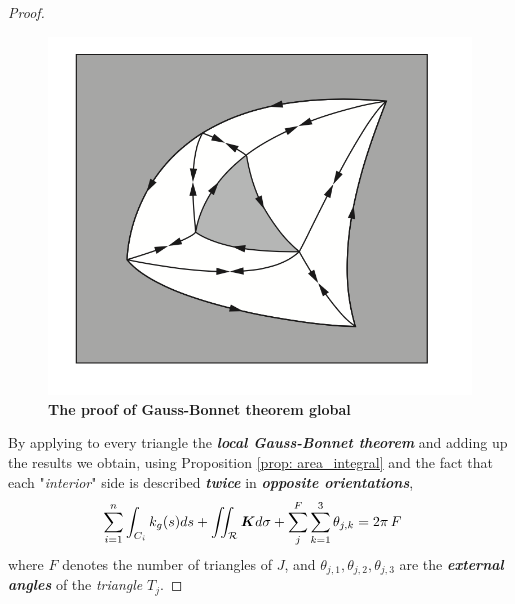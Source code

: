 \documentclass[11pt]{article}
\begin{document}
\begin{itemize}
\begin{proof}
\begin{figure}[htb]
\centering
\begin{minipage}{1\linewidth}
 \centerline{\includegraphics[scale = 0.5]{gauss_bonnet_global.png}}
\end{minipage}
\caption{\scriptsize
\textbf{The proof of Gauss-Bonnet theorem global \citep{do1976differential}}}
\label{fig: gauss_bonnet_global}
\end{figure}

By applying to every triangle the \emph{\textbf{local Gauss-Bonnet theorem}} and adding up the results we obtain, using Proposition \ref{prop: area_integral} and the fact that each "\emph{interior}" side is described \emph{\textbf{twice}} in \emph{\textbf{opposite orientations}},
\begin{align*}
\sum_{i=1}^{n}\int_{C_{i}}k_{g}(s)ds + \iint_{{\mathcal R}}\boldsymbol{K}d\sigma + \sum_{j}^{F}\sum_{k=1}^{3}\theta_{j,k} &= 2\pi\,F
\end{align*} where $F$ denotes the number of triangles of $J$, and $\theta_{j,1}, \theta_{j,2} , \theta_{j,3}$ are the \textbf{\emph{external angles}} of the \emph{triangle} $T_j$.


\end{proof}
\end{itemize}
\end{document}
